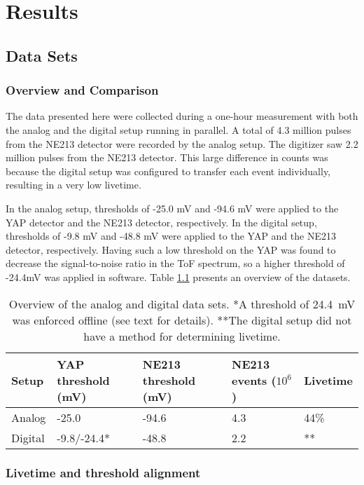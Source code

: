 \documentclass[main.tex]{subfiles}
\begin{document}
\chapter{Results}\label{ch:results}

\section{Data Sets}
\subsection{Overview and Comparison}
The data presented here were collected during a one-hour measurement with both the analog and the digital setup running in parallel. A total of 4.3 million pulses from the NE213 detector were recorded by the analog setup. The digitizer saw 2.2 million pulses from the NE213 detector. This large difference in counts was because the digital setup was configured to transfer each event individually, resulting in a very low livetime.

In the analog setup, thresholds of -25.0 mV and -94.6 mV were applied to the YAP detector and the NE213 detector, respectively. In the digital setup, thresholds of -9.8 mV and -48.8 mV were applied to the YAP and the NE213 detector, respectively. Having such a low threshold on the YAP was found to decrease the signal-to-noise ratio in the ToF spectrum, so a higher threshold of -24.4\si{\milli\volt} was applied in software. Table \ref{tab:settings} presents an overview of the datasets.
\begin{table}[bh]
\begin{tabular}{|l|l|l|l|l|}
\hline
Setup   & YAP threshold (mV) & NE213 threshold (mV) & NE213 events ($\text{10}^\text{6}$) & Livetime \\ \hline
Analog  & -25.0              & -94.6                & 4.3      & 44\%             \\ \hline
Digital & -9.8/-24.4*			& -48.8                & 2.2      & **             \\ \hline
\end{tabular}
\caption[Overview of the analog and digital data sets.]{Overview of the analog and digital data sets. *A threshold of \SI{24.4}{mV} was enforced offline (see text for details). **The digital setup did not have a method for determining livetime.}
\label{tab:settings}
\end{table}



\subsection{Livetime and threshold alignment}
\end{document}
